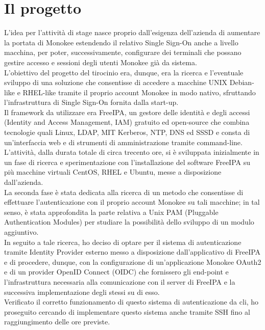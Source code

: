 \section{Il progetto}

L'idea per l'attività di stage nasce proprio dall'esigenza dell'azienda di aumentare la portata di Monokee estendendo il 
relativo Single Sign-On anche a livello macchina, per poter, successivamente, configurare dei terminali
che possano gestire accesso e sessioni degli utenti Monokee già da sistema. \\
L'obiettivo del progetto del tirocinio era, dunque, era la ricerca e l'eventuale sviluppo di una soluzione che consentisse
di accedere a macchine UNIX Debian-like e RHEL-like tramite il proprio account Monokee in modo nativo, sfruttando l'infrastruttura
di Single Sign-On fornita dalla start-up. \\
Il framework da utilizzare era FreeIPA, un gestore delle identità e degli accessi (Identity and Access Management, IAM)
gratuito ed open-source che combina tecnologie quali Linux, LDAP, MIT Kerberos, NTP, DNS ed SSSD e consta di un'interfaccia web
e di strumenti di amministrazione tramite command-line. \\
L'attività, dalla durata totale di circa trecento ore, si è sviluppata inizialmente in un fase di ricerca e sperimentazione
con l'installazione del software FreeIPA su più macchine virtuali CentOS, RHEL e Ubuntu,
messe a disposizione dall'azienda. \\
La seconda fase è stata dedicata alla ricerca di un metodo che consentisse di effettuare l'autenticazione con il
proprio account Monokee su tali macchine; in tal senso, è stata approfondita la parte relativa a 
Unix PAM (Pluggable Authentication Modules) per studiare la possibilità dello sviluppo di un modulo aggiuntivo. \\
In seguito a tale ricerca, ho deciso di optare per il sistema di autenticazione tramite Identity Provider esterno
messo a disposizione dall'applicativo di FreeIPA e di procedere, dunque, con la configurazione di un'applicazione
Monokee OAuth2 e di un provider OpenID Connect (OIDC) che fornissero gli end-point e l'infrastruttura 
necessaria alla comunicazione con il server di FreeIPA e la successiva implementazione degli stessi su di esso. \\
Verificato il corretto funzionamento di questo sistema di autenticazione da \gls{cli},
ho proseguito cercando di implementare questo sistema anche tramite SSH fino al raggiungimento delle ore previste. \\


